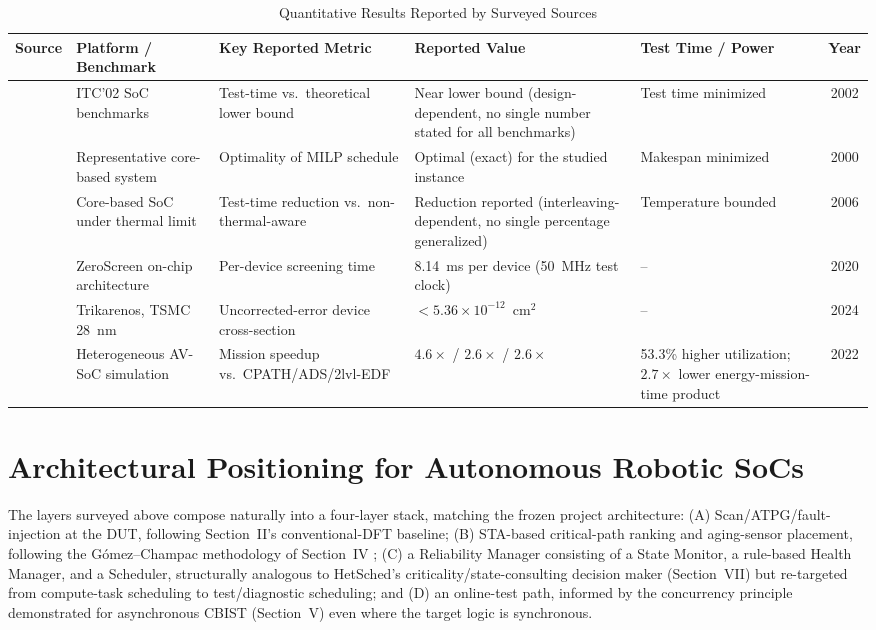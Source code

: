 \documentclass[journal]{IEEEtran}
\begin{document}
\begin{table}[t]
\caption{Quantitative Results Reported by Surveyed Sources}
\label{tab:quant}
\centering\footnotesize
\begin{tabularx}{\textwidth}{@{}lp{3.6cm}p{3.6cm}p{4.4cm}p{2.3cm}c@{}}
\toprule
Source & Platform / Benchmark & Key Reported Metric & Reported Value & Test Time / Power & Year\\
\midrule
\cite{r1} & ITC'02 SoC benchmarks & Test-time vs.\ theoretical lower bound & Near lower bound (design-dependent, no single number stated for all benchmarks) & Test time minimized & 2002\\
\cite{r2} & Representative core-based system & Optimality of MILP schedule & Optimal (exact) for the studied instance & Makespan minimized & 2000\\
\cite{r3} & Core-based SoC under thermal limit & Test-time reduction vs.\ non-thermal-aware & Reduction reported (interleaving-dependent, no single percentage generalized) & Temperature bounded & 2006\\
\cite{r7} & ZeroScreen on-chip architecture & Per-device screening time & 8.14~ms per device (50~MHz test clock) & -- & 2020\\
\cite{r8} & Trikarenos, TSMC 28~nm & Uncorrected-error device cross-section & $<5.36\times10^{-12}$~cm$^2$ & -- & 2024\\
\cite{r18} & Heterogeneous AV-SoC simulation & Mission speedup vs.\ CPATH/ADS/2lvl-EDF & $4.6\times$ / $2.6\times$ / $2.6\times$ & 53.3\% higher utilization; $2.7\times$ lower energy-mission-time product & 2022\\
\bottomrule
\end{tabularx}
\end{table}


\section{Architectural Positioning for Autonomous Robotic SoCs}
The layers surveyed above compose naturally into a four-layer stack, matching the frozen project architecture: (A) Scan/ATPG/fault-injection at the DUT, following Section~II's conventional-DFT baseline; (B) STA-based critical-path ranking and aging-sensor placement, following the G\'omez--Champac methodology of Section~IV \cite{r4}; (C) a Reliability Manager consisting of a State Monitor, a rule-based Health Manager, and a Scheduler, structurally analogous to HetSched's criticality/state-consulting decision maker (Section~VII) but re-targeted from compute-task scheduling to test/diagnostic scheduling; and (D) an online-test path, informed by the concurrency principle demonstrated for asynchronous CBIST (Section~V) even where the target logic is synchronous.
\end{document}
